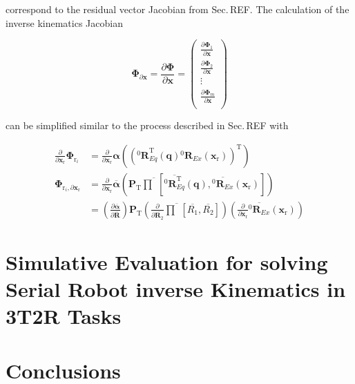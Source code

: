 \documentclass[twocolumn,10pt]{IFTOMM}
\newcommand{\bm}[1]{\boldsymbol{#1}}
\newcommand{\rotmat}[2]{{{ }^{#1}\boldsymbol{R}}_{#2}}
\newcommand{\transp}[0]{{\mathrm{T}}}
\begin{document}
correspond to the residual vector Jacobian from Sec.\,REF.
The calculation of the inverse kinematics Jacobian

\begin{equation}
\bm{\Phi}_{\partial \bm{x}}
=
\frac{\partial \bm{\Phi}}{\partial \bm{x}}
=
\begin{pmatrix}
\frac{\partial \bm{\Phi}_1}{\partial \bm{x}}\\
\frac{\partial \bm{\Phi}_2}{\partial \bm{x}}\\
\vdots \\
\frac{\partial \bm{\Phi}_m}{\partial \bm{x}}\\
\end{pmatrix}
\end{equation}  

can be simplified similar to the process described in Sec.\,REF with

\begin{align}
\frac{\partial}{\partial \bm{x}_{\mathrm{r}}}\bm{\Phi}_{\mathrm{r}_i}
&=
\frac{\partial}{\partial \bm{x}_{\mathrm{r}}} \bm{\alpha}\left((\rotmat{0}{Eq}^\transp(\bm{q}) \rotmat{0}{Ex}(\bm{x}_{\mathrm{r}}))^\transp\right) \nonumber \\
\bm{\Phi}_{\mathrm{r}_i,\partial \bm{x}_{\mathrm{r}}} 
&=
\frac{\partial}{\partial \bm{x}_{\mathrm{r}}} \overline{\bm{\alpha}}\left(
\bm{P}_{\mathrm{T}}
\overline{\prod}\left[ \overline{\rotmat{0}{Eq}^\transp}(\bm{q}), \overline{\rotmat{0}{Ex}}(\bm{x}_{\mathrm{r}})\right]\right) \nonumber \\
&=
\left(\frac{\partial \overline{\bm{\alpha}}}{\partial \overline{\bm{R}}}\right)
\bm{P}_{\mathrm{T}}
\left(\frac{\partial }{\partial \overline{\bm{R}_2}}
\overline{\prod}\left[ \overline{R_1}, \overline{R_2}\right]\right)
\left(\frac{\partial}{\partial \bm{x}_{\mathrm{r}}} \overline{\rotmat{0}{Ex}}(\bm{x}_{\mathrm{r}})\right) \nonumber
\end{align}





\section{Simulative Evaluation for solving Serial Robot inverse Kinematics in 3T2R Tasks}
\label{sec:SimEvalSerRobIK}

\section{Conclusions}
\label{sec:Conclusion}
\end{document}
